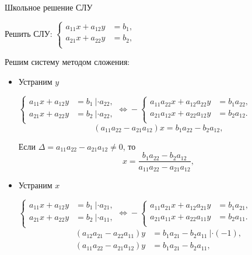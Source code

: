 \documentclass[unicode,11pt,notheorems]{beamer}
\begin{document}
\begin{frame}[allowframebreaks]{Школьное решение СЛУ}
\begin{block}{}
Решить СЛУ: 
$
\left\lbrace
\begin{aligned}
	a_{11}x+a_{12}y &= b_1,\\
	a_{21}x+a_{22}y &= b_2,\\
\end{aligned}
\right.
$
\end{block}
Решим систему методом сложения:
\begin{itemize}
\item Устраним $y$ 

$
\left\lbrace
\begin{aligned}
	a_{11}x+a_{12}y &= b_1\: | \cdot a_{22},\\
	a_{21}x+a_{22}y &= b_2\: | \cdot a_{22},\\
\end{aligned}
\right. \Leftrightarrow
{}-\!\!\left\lbrace
\begin{aligned}
	a_{11}a_{22}x+a_{12}a_{22}y &= b_1a_{22},\\
	a_{21}a_{12}x+a_{22}a_{12}y &= b_2a_{12}.\\
\end{aligned}
\right.
$
$$
	(a_{11}a_{22}-a_{21}a_{12})x  = b_1a_{22} - b_2a_{12},
$$

Если $\Delta=a_{11}a_{22}-a_{21}a_{12} \neq 0$, то
$$
	x= \frac{b_1a_{22} - b_2a_{12}}{a_{11}a_{22}-a_{21}a_{12}},
$$

\item Устраним $x$ 

$
\left\lbrace
\begin{aligned}
	a_{11}x+a_{12}y &= b_1\: | \cdot a_{21},\\
	a_{21}x+a_{22}y &= b_2\: | \cdot a_{11},\\
\end{aligned}
\right. \Leftrightarrow
{}-\!\!\left\lbrace
\begin{aligned}
	a_{11}a_{21}x+a_{12}a_{21}y &= b_1a_{21},\\
	a_{21}a_{11}x+a_{22}a_{11}y &= b_2a_{11}.\\
\end{aligned}
\right.
$
$$
	\begin{aligned}
	(a_{12}a_{21}-a_{22}a_{11})y  &= b_1a_{21} - b_2a_{11}\:|\cdot(-1),\\
	(a_{11}a_{22}-a_{21}a_{12})y  &= b_1a_{21} - b_2a_{11},
	\end{aligned}
$$


\end{itemize}
\end{frame}
\end{document}
